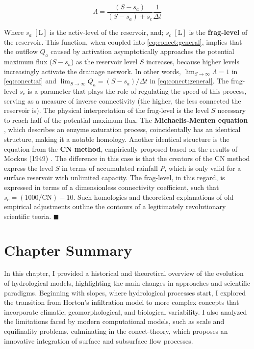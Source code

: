\documentclass[./main_en.tex]{subfiles}
\begin{document}
\begin{linenomath*}
\begin{equation} 
	\label{eq:conect:af}
	\Lambda = \frac{(S - s_a)}{(S - s_a) + s_c} \frac{1}{\Delta t}
\end{equation}
\end{linenomath*}
Where $s_{a}\;[\text{L}]$ is the \gls{activ-level} of the reservoir, and;  $s_{c}\;[\text{L}]$ is the \textbf{\gls{frag-level}} of the reservoir. This function, when coupled into \eqref{eq:conect:general}, implies that the outflow $Q_a$ caused by activation asymptotically approaches the potential maximum flux ($S - s_a$) as the reservoir level $S$ increases, because higher levels increasingly activate the drainage network. In other words, $\lim _{S \to \infty} \Lambda= 1$ in \eqref{eq:conect:af} and $\lim _{S \to \infty} Q_a = (S - s_a)/ \Delta t$ in \eqref{eq:conect:general}. The \gls{frag-level} $s_c$ is a parameter that plays the role of regulating the speed of this process, serving as a measure of inverse connectivity (the higher, the less connected the reservoir is). The physical interpretation of the \gls{frag-level} is the level $S$ necessary to reach half of the potential maximum flux. The \textbf{Michaelis-Menten equation} \cite{Johnson2011a}, which describes an enzyme saturation process, coincidentally has an identical structure, making it a notable \gls{homology}. Another identical structure is the equation from the \textbf{CN method}, empirically proposed based on the results of Mockus (1949) \cite{mockus1949}. The difference in this case is that the creators of the CN method express the level $S$ in terms of accumulated rainfall $P$, which is only valid for a surface reservoir with unlimited capacity. The \gls{frag-level}, in this regard, is expressed in terms of a dimensionless connectivity coefficient, such that $s_c = (1000/\text{CN}) - 10$. Such homologies and theoretical explanations of old empirical adjustments outline the contours of a legitimately revolutionary scientific \gls{teoria}. $\blacksquare$

\clearpage

\section{Chapter Summary} \label{sec:hydro:summary}

\par In this chapter, I provided a historical and theoretical overview of the evolution of hydrological models, highlighting the main changes in approaches and scientific paradigms. Beginning with slopes, where hydrological processes start, I explored the transition from Horton’s infiltration model to more complex concepts that incorporate climatic, geomorphological, and biological variability. I also analyzed the limitations faced by modern computational models, such as scale and equifinality problems, culminating in the \gls{conect-theory}, which proposes an innovative integration of surface and subsurface flow processes.
\end{document}
